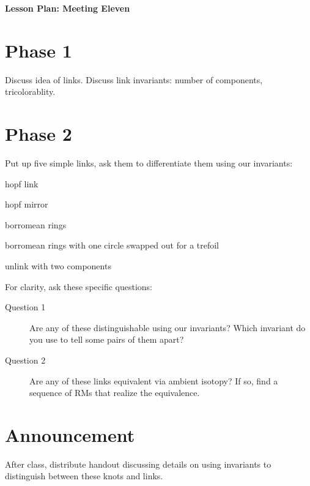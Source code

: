 \documentclass[12pt]{amsart}
\theoremstyle{definition}
\begin{document}
\begin{center}
\textbf{\Huge
Lesson Plan: Meeting Eleven
}
\end{center}
\vspace{.5in}

\section*{Phase 1}
Discuss idea of links.
Discuss link invariants: number of components, tricolorablity.

\section*{Phase 2}
Put up five simple links, ask them to differentiate them using our invariants:
\begin{compactenum}
\item hopf link
\item hopf mirror
\item borromean rings
\item borromean rings with one circle swapped out for a trefoil
\item unlink with two components\\
\end{compactenum}

For clarity, ask these specific questions:
\begin{description}
\item[Question 1]  Are any of these distinguishable using our invariants? Which invariant do you use to tell some pairs of them apart?

\item[Question 2] Are any of these links equivalent via ambient isotopy? If so, find a sequence of RMs that realize the equivalence.
\end{description}

\section*{Announcement}
After class, distribute handout discussing details on using invariants to distinguish between these knots and links.
\end{document}
